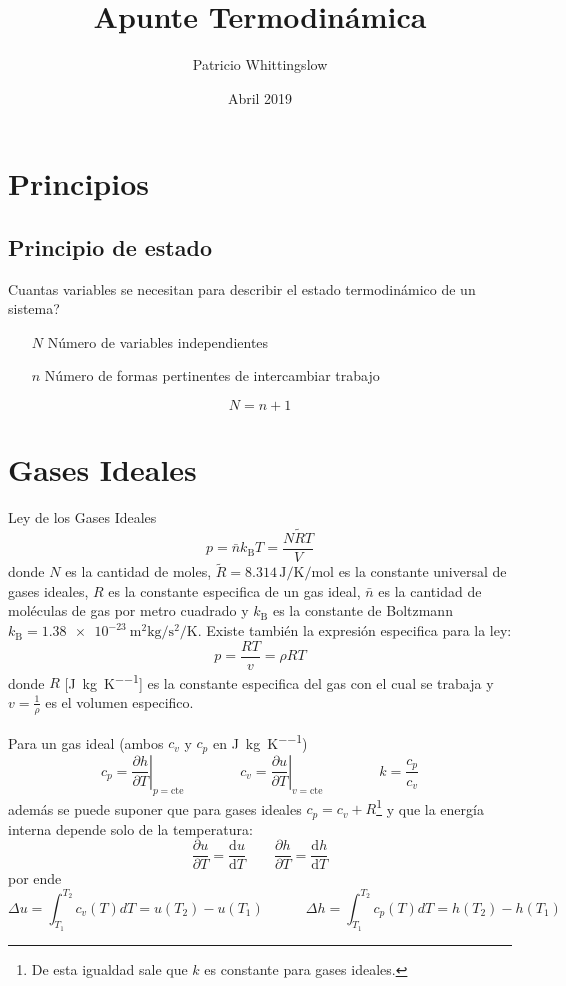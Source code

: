 \documentclass{article}
\title{Apunte Termodinámica}
\author{Patricio Whittingslow}
\date{Abril 2019}
\newcommand{\ctegas}{k}
\newcommand{\cte}{\textrm{cte}}
\newcommand{\cp}{c_{p}}
\newcommand{\cv}{c_{v}}
\newcommand{\sib}[1]{[\si{#1}]}
\newcommand{\Boltzmann}{k_{\textrm{B}}}
\newcommand{\moldens}{\bar{n}}
\newcommand{\spartial}[2]{\frac{\partial #1}{\partial #2}}
\newcommand{\di}{\textrm{d}}
\begin{document}
\maketitle
\section{Principios}
\subsection{Principio de estado}
Cuantas variables se necesitan para describir el estado termodinámico de un sistema?
\begin{itemize}
    \item[$N$] Número de variables independientes
    \item[$n$] Número de formas pertinentes de intercambiar trabajo
\end{itemize}
\[
N= n + 1
\]

\section{ Gases Ideales }
Ley de los Gases Ideales
\[p  = \moldens \Boltzmann T= \frac{N\tilde{R}T}{V}
\]
donde $N$ es la cantidad de moles, $\tilde{R}=8.314\, \si{\joule \per \kelvin\per \mole}$ es la constante universal de gases ideales, $R$ es la constante especifica de un gas ideal, $\moldens$ es la cantidad de moléculas de gas por metro cuadrado y $\Boltzmann$ es la constante de Boltzmann $\Boltzmann=\SI{1,38e-23}{\meter \squared \kilogram \per \second \squared \per \kelvin}$. Existe también la expresión especifica para la ley:
\[
p = \frac{RT}{v}=\rho RT
\]
donde $R$ \sib{\joule \per \kilogram \per \kelvin} es la constante especifica del gas con el cual se trabaja y $v=\frac{1}{\rho}$ es el volumen especifico.

Para un gas ideal (ambos $\cv$ y $\cp$ en \si{\joule \per \kilogram \per \kelvin})
\[
\cp = \left. \spartial{h}{T} \right|_{p=\cte} \qquad\qquad \cv = \left. \spartial{u}{T}\right|_{v = \cte} \qquad \qquad \ctegas=\frac{\cp}{\cv}
\]
además se puede suponer que para gases ideales $\cp = \cv +R$\footnote{De esta igualdad sale que $\ctegas$ es constante para gases ideales.} y que la energía interna depende solo de la temperatura:
\[
\spartial{u}{T}=\frac{\di u}{\di T}\qquad \spartial{h}{T}=\frac{\di h}{\di T}
\]
por ende
\[
\Delta u = \int^{T_2}_{T_1} \cv (T)dT=u(T_2) - u(T_1) \qquad\quad  \Delta h = \int^{T_2}_{T_1} \cp (T)dT = h(T_2) - h(T_1)
\]
\end{document}
